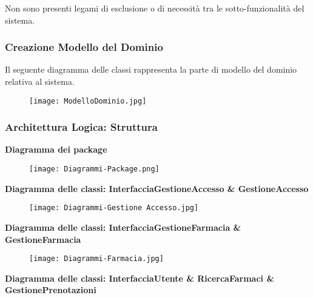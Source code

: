 Non sono presenti legami di esclusione o di necessità tra le sotto-funzionalità del sistema. 

\newpage
\subsubsection{Creazione Modello del Dominio}

Il seguente diagramma delle classi rappresenta la parte di modello del dominio relativa al sistema. \\

\begin{figure}[h!]
    \begin{center}
        \texttt{[image: ModelloDominio.jpg]}
    \end{center}
\end{figure}
\hfill \break

\newpage
\subsubsection{Architettura Logica: Struttura}
\hfill \break

\textbf{Diagramma dei package}
\hfill \break

\begin{figure}[h!]
    \begin{center}
        \texttt{[image: Diagrammi-Package.png]}
    \end{center}
\end{figure}
\hfill \break

\textbf{Diagramma delle classi: InterfacciaGestioneAccesso \& GestioneAccesso}
\hfill \break

\begin{figure}[h!]
    \begin{center}
        \texttt{[image: Diagrammi-Gestione Accesso.jpg]}
    \end{center}
\end{figure}
\hfill \break

\textbf{Diagramma delle classi: InterfacciaGestioneFarmacia \& GestioneFarmacia}
\hfill \break

\begin{figure}[h!]
    \begin{center}
        \texttt{[image: Diagrammi-Farmacia.jpg]}
    \end{center}
\end{figure}
\hfill \break

\newpage
\textbf{Diagramma delle classi: InterfacciaUtente \& RicercaFarmaci \& GestionePrenotazioni }

